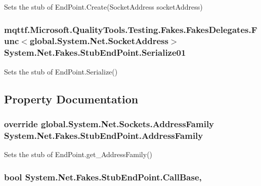 Sets the stub of End\-Point.\-Create(\-Socket\-Address socket\-Address)

\hypertarget{class_system_1_1_net_1_1_fakes_1_1_stub_end_point_adc059ec4e6206dea2aebf68ff98347a2}{
\subsubsection[{Serialize01}]{\setlength{\rightskip}{0pt plus 5cm}mqttf.\-Microsoft.\-Quality\-Tools.\-Testing.\-Fakes.\-Fakes\-Delegates.\-Func$<$global.\-System.\-Net.\-Socket\-Address$>$ System.\-Net.\-Fakes.\-Stub\-End\-Point.\-Serialize01}}\label{class_system_1_1_net_1_1_fakes_1_1_stub_end_point_adc059ec4e6206dea2aebf68ff98347a2}


Sets the stub of End\-Point.\-Serialize()



\subsection{Property Documentation}
\hypertarget{class_system_1_1_net_1_1_fakes_1_1_stub_end_point_a318a7aa0125d1a945a8eb4a773101eb7}{
\subsubsection[{Address\-Family}]{\setlength{\rightskip}{0pt plus 5cm}override global.\-System.\-Net.\-Sockets.\-Address\-Family System.\-Net.\-Fakes.\-Stub\-End\-Point.\-Address\-Family\hspace{0.3cm}{\ttfamily [get]}}}\label{class_system_1_1_net_1_1_fakes_1_1_stub_end_point_a318a7aa0125d1a945a8eb4a773101eb7}


Sets the stub of End\-Point.\-get\-\_\-\-Address\-Family()

\hypertarget{class_system_1_1_net_1_1_fakes_1_1_stub_end_point_a7a3941b78a8fd795693ee8c4cc5d4a14}{
\subsubsection[{Call\-Base}]{\setlength{\rightskip}{0pt plus 5cm}bool System.\-Net.\-Fakes.\-Stub\-End\-Point.\-Call\-Base\hspace{0.3cm}{\ttfamily [get]}, {\ttfamily [set]}}}\label{class_system_1_1_net_1_1_fakes_1_1_stub_end_point_a7a3941b78a8fd795693ee8c4cc5d4a14}


